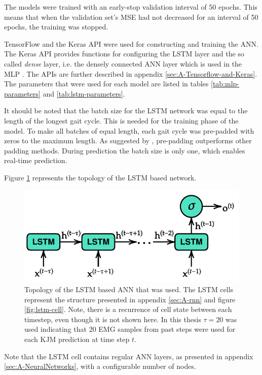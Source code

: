 \documentclass[../main.tex]{subfiles}
\begin{document}
The models were trained with an early-stop validation interval of 50 epochs.
This means that when the validation set's \ac{MSE} had not decreased for an interval of 50 epochs, the training was stopped.

TensorFlow \cite{tensorflow2015-whitepaper} and the Keras API \cite{chollet2015keras} were used for constructing and training the \ac{ANN}.
The Keras API provides functions for configuring the \ac{LSTM} layer and the so called \textit{dense} layer, i.e. the densely connected \ac{ANN} layer which is used in the \ac{MLP} \cite{chollet2015keras}.
The APIs are further described in appendix \ref{sec:A-Tensorflow-and-Keras}.
The parameters that were used for each model are listed in tables \ref{tab:mlp-parameters} and \ref{tab:lstm-parameters}.

It should be noted that the batch size for the \ac{LSTM} network was equal to the length of the longest gait cycle.
This is needed for the training phase of the model.
To make all batches of equal length, each gait cycle was pre-padded with zeros to the maximum length.
As suggested by \textcite{Dwarampudi2019}, pre-padding outperforms other padding methods.
During prediction the batch size is only one, which enables real-time prediction.

Figure \ref{fig:lstm-model-used} represents the topology of the \ac{LSTM} based network.
\begin{figure}[!htb]
    \centering
    \includegraphics{img/LSTM_model_used.pdf}
    \caption{Topology of the \ac{LSTM} based \ac{ANN} that was used. The \ac{LSTM} cells represent the structure presented in appendix \ref{sec:A-rnn} and figure \ref{fig:lstm-cell}. Note, there is a recurrence of cell state between each timestep, even though it is not shown here. In this thesis $\tau = 20$ was used indicating that 20 \ac{EMG} samples from past steps were used for each \ac{KJM} prediction at time step $t$.}
    \label{fig:lstm-model-used}
\end{figure}
Note that the \ac{LSTM} cell contains regular \ac{ANN} layers, as presented in appendix \ref{sec:A-NeuralNetworks}, with a configurable number of nodes.
\end{document}
